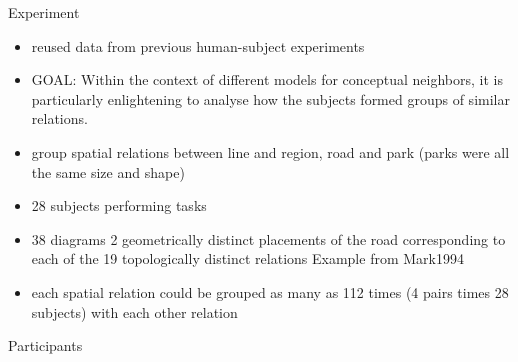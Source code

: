 

\begin{frame}{Experiment}
	\begin{itemize}
		\item reused data from previous human-subject experiments
		\item GOAL: Within the context of different models for conceptual neighbors, it is particularly enlightening to analyse how the subjects formed groups of similar relations.
		
		\item group spatial relations between line and region, road and park (parks were all the same size and shape)
		\item 28 subjects performing tasks
		\item 38 diagrams %
		2 geometrically distinct placements of the road corresponding to each of the 19 topologically distinct relations
		\ToDo Example from Mark1994
		\item each spatial relation could be grouped as many as 112 times (4 pairs times 28 subjects) with each other relation
	\end{itemize}
\end{frame}

\begin{frame}{Participants}
\end{frame}

